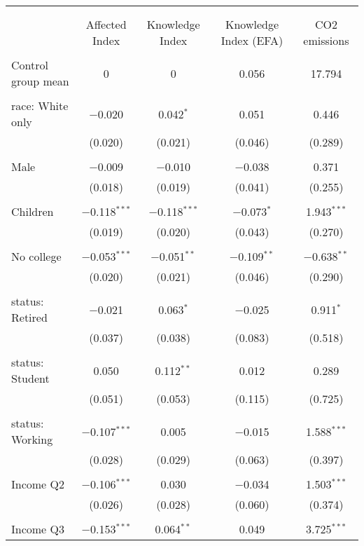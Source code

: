 
\begin{tabular}{@{\extracolsep{5pt}}lcccc} 
\\[-1.8ex]\hline 
\hline \\[-1.8ex] 
\\[-1.8ex] & Affected Index & Knowledge Index & Knowledge Index (EFA) & CO2 emissions \\ 
\hline \\[-1.8ex] 
 Control group mean & 0 & 0 & 0.056 & 17.794  \\ \hline \\[-1.8ex] race: White only & $-$0.020 & 0.042$^{*}$ & 0.051 & 0.446 \\ 
  & (0.020) & (0.021) & (0.046) & (0.289) \\ 
  & & & & \\ 
 Male & $-$0.009 & $-$0.010 & $-$0.038 & 0.371 \\ 
  & (0.018) & (0.019) & (0.041) & (0.255) \\ 
  & & & & \\ 
 Children & $-$0.118$^{***}$ & $-$0.118$^{***}$ & $-$0.073$^{*}$ & 1.943$^{***}$ \\ 
  & (0.019) & (0.020) & (0.043) & (0.270) \\ 
  & & & & \\ 
 No college & $-$0.053$^{***}$ & $-$0.051$^{**}$ & $-$0.109$^{**}$ & $-$0.638$^{**}$ \\ 
  & (0.020) & (0.021) & (0.046) & (0.290) \\ 
  & & & & \\ 
 status: Retired & $-$0.021 & 0.063$^{*}$ & $-$0.025 & 0.911$^{*}$ \\ 
  & (0.037) & (0.038) & (0.083) & (0.518) \\ 
  & & & & \\ 
 status: Student & 0.050 & 0.112$^{**}$ & 0.012 & 0.289 \\ 
  & (0.051) & (0.053) & (0.115) & (0.725) \\ 
  & & & & \\ 
 status: Working & $-$0.107$^{***}$ & 0.005 & $-$0.015 & 1.588$^{***}$ \\ 
  & (0.028) & (0.029) & (0.063) & (0.397) \\ 
  & & & & \\ 
 Income Q2 & $-$0.106$^{***}$ & 0.030 & $-$0.034 & 1.503$^{***}$ \\ 
  & (0.026) & (0.028) & (0.060) & (0.374) \\ 
  & & & & \\ 
 Income Q3 & $-$0.153$^{***}$ & 0.064$^{**}$ & 0.049 & 3.725$^{***}$ \\ 

\end{tabular}
